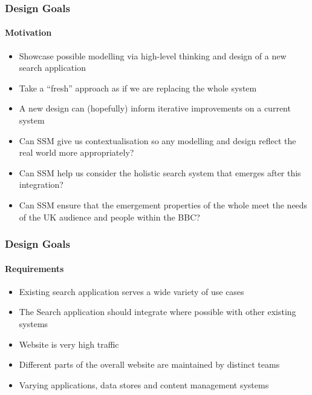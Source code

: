 \documentclass{beamer}
\begin{document}
\begin{frame}
  \frametitle{Design Goals}
  \framesubtitle{Motivation}
  \begin{itemize}
    \pause \item Showcase possible modelling via high-level thinking and design of a new search application
    \pause \item Take a ``fresh'' approach as if we are replacing the whole system
    \pause \item A new design can (hopefully) inform iterative improvements on a current system
    \pause \item Can SSM give us contextualisation so any modelling and design reflect the real world more appropriately?
    \pause \item Can SSM help us consider the holistic search system that emerges after this integration?
    \pause \item Can SSM ensure that the emergement properties of the whole meet the needs of the UK audience and people within the BBC?
  \end{itemize}
\end{frame}

\begin{frame}
  \frametitle{Design Goals}
  \framesubtitle{Requirements}
  \begin{itemize}
    \pause \item Existing search application serves a wide variety of use cases
    \pause \item The Search application should integrate where possible with other existing systems
    \pause \item Website is very high traffic
    \pause \item Different parts of the overall website are maintained by distinct teams
    \pause \item Varying applications, data stores and content management systems
  \end{itemize}
\end{frame}
\end{document}
